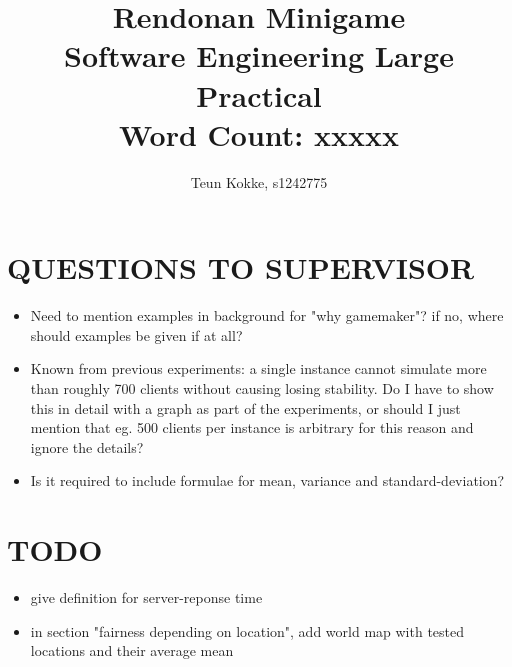 \documentclass[12pt]{article}
\begin{document}
\author{Teun Kokke, s1242775}
\title
{
	\vspace*{\dimexpr-1.4in-\topmargin-\headsep-\headheight-\baselineskip}%
	\hspace*{\dimexpr-1.2in-\evensidemargin-\parindent}%
    Rendonan Minigame\\
    {\small Software Engineering Large Practical\\Word Count: xxxxx}
    \vspace{18em}
}

\begin{titlepage}
\maketitle
\end{titlepage}

\section*{QUESTIONS TO SUPERVISOR}
\begin{itemize}
\item Need to mention examples in background for "why gamemaker"? if no, where should examples be given if at all?
\item Known from previous experiments: a single instance cannot simulate more than roughly 700 clients without causing losing stability. Do I have to show this in detail with a graph as part of the experiments, or should I just mention that eg. 500 clients per instance is arbitrary for this reason and ignore the details?
\item Is it required to include formulae for mean, variance and standard-deviation?
\end{itemize}

\section*{TODO}
\begin{itemize}
\item give definition for server-reponse time
\item in section "fairness depending on location", add world map with tested locations and their average mean
\end{itemize}
\end{document}
